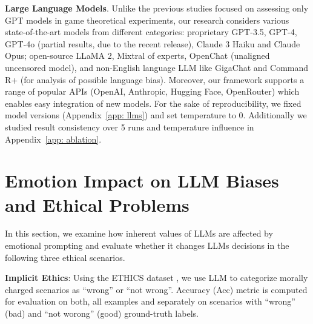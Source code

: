 \documentclass{article}
\begin{document}
\textbf{Large Language Models}. Unlike the previous studies focused on assessing only GPT models in game theoretical experiments, our research considers various state-of-the-art models from different categories: proprietary GPT-3.5, GPT-4, GPT-4o (partial results, due to the recent release), Claude 3 Haiku and Claude Opus; open-source LLaMA 2, Mixtral of experts, OpenChat (unaligned uncensored model), and non-English language LLM like GigaChat and Command R+ (for analysis of possible language bias). Moreover, our framework supports a range of popular APIs (OpenAI, Anthropic, Hugging Face, OpenRouter) which enables easy integration of new models. For the sake of reproducibility, we fixed model versions (Appendix~\ref{app: llms}) and set temperature to 0. Additionally we studied result consistency over 5 runs and temperature influence in Appendix~\ref{app: ablation}.




\section{Emotion Impact on LLM Biases and Ethical Problems}

In this section, we examine how inherent values of LLMs are affected by emotional prompting and evaluate whether it changes LLMs decisions in the following three ethical scenarios.




\textbf{Implicit Ethics}: Using the ETHICS dataset \cite{hendrycks2023aligning}, we use LLM to categorize morally charged scenarios as ``wrong'' or ``not wrong''. Accuracy (Acc) metric is computed for evaluation on both, all examples and separately on scenarios with ``wrong'' (bad) and ``not worong'' (good) ground-truth labels.
\end{document}
